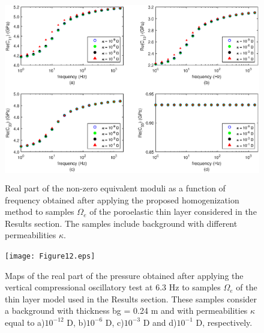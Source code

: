 \documentclass[draft]{agujournal2019}
\begin{document}
\begin{figure}[!ht]
\centering
        \includegraphics[width= 120mm, height=80mm]{Figure11.eps}
\caption{Real part of the non-zero equivalent moduli as a function of frequency obtained after applying the proposed homogenization method to samples $\Omega_e$ of the poroelastic thin layer considered in the Results section. The samples include background with different permeabilities $\kappa$.}
\label{fig.11}
\end{figure}

\begin{figure}[!ht]
\centering
        \texttt{[image: Figure12.eps]}
\caption{Maps of the real part of the pressure obtained after applying the vertical compressional oscillatory test at 6.3 Hz to samples $\Omega_e$ of the thin layer model used in the Results section. These samples consider a background with thickness bg = 0.24 m  and with permeabilities $\kappa$ equal to a)$10^{-12}$ D, b)$10^{-6}$ D, c)$10^{-3}$ D and d)$10^{-1}$ D, respectively. }
\label{fig.12}
\end{figure}
\end{document}
